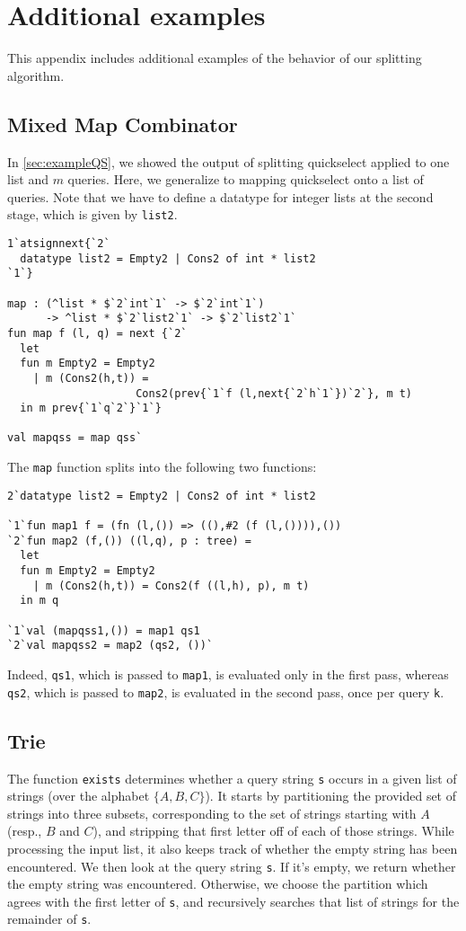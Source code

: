 
\section{Additional examples}

This appendix includes additional examples of the behavior of our
splitting algorithm.

\subsection {Mixed Map Combinator}

In \ref{sec:exampleQS}, we showed the output of splitting quickselect
applied to one list and $m$ queries.  Here, we generalize to mapping
quickselect onto a list of queries. Note that we have to define a
datatype for integer lists at the second stage, which is given by
\texttt{list2}.
\begin{lstlisting} 
1`atsignnext{`2`
  datatype list2 = Empty2 | Cons2 of int * list2
`1`}

map : (^list * $`2`int`1` -> $`2`int`1`)
      -> ^list * $`2`list2`1` -> $`2`list2`1`
fun map f (l, q) = next {`2`
  let 
  fun m Empty2 = Empty2
    | m (Cons2(h,t)) =
                    Cons2(prev{`1`f (l,next{`2`h`1`})`2`}, m t)
  in m prev{`1`q`2`}`1`}

val mapqss = map qss`
\end{lstlisting}
The \texttt{map} function splits into the following two functions:
\begin{lstlisting} 
2`datatype list2 = Empty2 | Cons2 of int * list2

`1`fun map1 f = (fn (l,()) => ((),#2 (f (l,()))),())
`2`fun map2 (f,()) ((l,q), p : tree) =
  let 
  fun m Empty2 = Empty2
    | m (Cons2(h,t)) = Cons2(f ((l,h), p), m t) 
  in m q

`1`val (mapqss1,()) = map1 qs1
`2`val mapqss2 = map2 (qs2, ())`
\end{lstlisting}
%
Indeed, \texttt{qs1}, which is passed to \texttt{map1}, is evaluated only in the
first pass, whereas \texttt{qs2}, which is passed to \texttt{map2}, is evaluated
in the second pass, once per query \texttt{k}.

\subsection{Trie}

The function {\tt exists} determines whether a query string \texttt{s} occurs in
a given list of strings (over the alphabet $\{A,B,C\}$). It starts by
partitioning the provided set of strings into three subsets, corresponding to
the set of strings starting with $A$ (resp., $B$ and $C$), and stripping that
first letter off of each of those strings. While processing the input list, it
also keeps track of whether the empty string has been encountered.
%
We then look at the query string \texttt{s}. If it's empty, we return whether
the empty string was encountered. Otherwise, we choose the partition which
agrees with the first letter of \texttt{s}, and recursively searches that list
of strings for the remainder of \texttt{s}.

